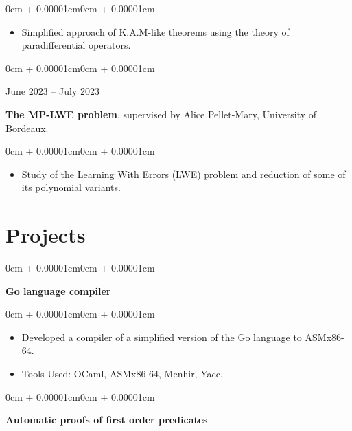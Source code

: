 \documentclass[10pt, letterpaper]{article}
\newenvironment{highlights}{
    \begin{itemize}[
        topsep=0.10cm,
        parsep=0.10cm,
        partopsep=0pt,
        itemsep=0pt,
        leftmargin=0cm + 10pt
    ]
}{
    \end{itemize}
}
\newenvironment{onecolentry}{
    \begin{adjustwidth}{0cm + 0.00001cm}{0cm + 0.00001cm}
}{
    \end{adjustwidth}
}
\newenvironment{twocolentry}[2][]{
    \onecolentry
    \def\firstColumn{#2}
    \setcolumnwidth{4.5cm, \fill}
    \begin{paracol}{2}
    \raggedright \firstColumn \switchcolumn
}{
    \end{paracol}
    \endonecolentry
}
\begin{document}
\vspace{0.10cm}
\begin{onecolentry}
    \begin{highlights}
        \item Simplified approach of K.A.M-like theorems using the theory of paradifferential operators.
    \end{highlights}
\end{onecolentry}

\vspace{0.2cm}

\begin{twocolentry}{June 2023 – July 2023}
    \textbf{The MP-LWE problem}, supervised by Alice Pellet-Mary, University of Bordeaux.
\end{twocolentry}

\vspace{0.10cm}
\begin{onecolentry}
    \begin{highlights}
        \item Study of the Learning With Errors (LWE) problem and reduction of some of its polynomial variants.
    \end{highlights}
\end{onecolentry}

\vspace{0.2cm}

\section{Projects}

\begin{onecolentry}
    \textbf{Go language compiler}
\end{onecolentry}

\vspace{0.10cm}
\begin{onecolentry}
    \begin{highlights}
        \item Developed a compiler of a simplified version of the Go language to ASMx86-64.
        \item Tools Used: OCaml, ASMx86-64, Menhir, Yacc.
    \end{highlights}
\end{onecolentry}

\vspace{0.2cm}

\begin{onecolentry}
    \textbf{Automatic proofs of first order predicates}
\end{onecolentry}
\end{document}
